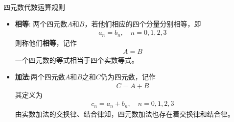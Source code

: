 \documentclass[UTF8,AutoFakeBold,AutoFakeSlant]{beamer}
\begin{document}
\begin{frame}{四元数代数运算规则}
    \begin{itemize}
        \item \textbf{相等}: 两个四元数$A$和$B$，若他们相应的四个分量分别相等，即
              \begin{align*}
                  a_n=b_n, \quad n=0,1,2,3
              \end{align*}
              则称他们\textbf{相等}，记作
              \begin{align*}
                  A=B
              \end{align*}
              一个四元数的等式相当于四个实数等式。
        \item \textbf{加法}:两个四元数$A$和$B$之和$C$仍为四元数，记作
              \begin{align*}
                  C=A+B
              \end{align*}
              其定义为
              \begin{align*}
                  c_n=a_n+b_n,\quad n=0,1,2,3
              \end{align*}
              由实数加法的交换律、结合律知，四元数加法也存在着交换律和结合律。
    \end{itemize}
\end{frame}
\end{document}
